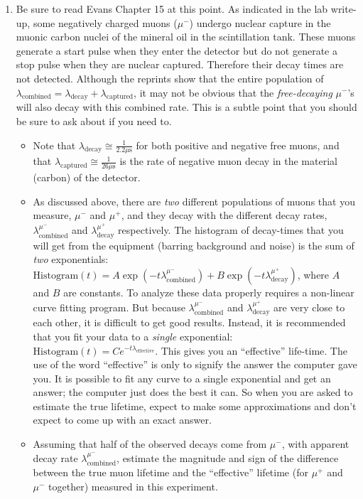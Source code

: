 \documentclass{../lab}
\begin{document}
\begin{enumerate}
    \item Be sure to read Evans Chapter 15 at this point. As indicated in the lab write-up, some negatively charged muons ($\mu^-$) undergo nuclear capture in the muonic carbon nuclei of the mineral oil in the scintillation tank. These muons generate a start pulse when they enter the detector but do not generate a stop pulse when they are nuclear captured. Therefore their decay times are not detected. Although the reprints show that the entire population of $\lambda_\text{combined} = \lambda_\text{decay} + \lambda_\text{captured}$, it may not be obvious that the \emph{free-decaying} $\mu^-$'s will also decay with this combined rate. This is a subtle point that you should be sure to ask about if you need to.

    \begin{itemize}
        \item Note that $ \lambda_\text{decay}\cong\frac{1}{2.2\mu\text{s}} $ for both positive and negative free muons, and that $ \lambda_\text{captured}\cong\frac{1}{26\mu\text{s}} $ is the rate of negative muon decay in the material (carbon) of the detector.

        \item As discussed above, there are \emph{two} different populations of muons that you measure, $\mu^-$ and $\mu^+$, and they decay with the different decay rates, $\lambda_\text{combined}^{\mu^-}$ and $\lambda_\text{decay}^{\mu^+}$ respectively. The histogram of decay-times that you will get from the equipment (barring background and noise) is the sum of \emph{two} exponentials: $\text{Histogram}(t) = A \exp(-t\lambda_\text{combined}^{\mu^-}) + B \exp(-t\lambda_\text{decay}^{\mu^+}) $, where $A$ and $B$ are constants. To analyze these data properly requires a non-linear curve fitting program. But because $\lambda_\text{combined}^{\mu^-}$ and $\lambda_\text{decay}^{\mu^+}$ are very close to each other, it is difficult to get good results. Instead, it is recommended that you fit your data to a \emph{single} exponential: $\text{Histogram}(t) = Ce^{-t\lambda_\text{effective}}$. This gives you an ``effective'' life-time. The use of the word ``effective'' is only to signify the answer the computer gave you. It is possible to fit any curve to a single exponential and get an answer; the computer just does the best it can. So when you are asked to estimate the true lifetime, expect to make some approximations and don't expect to come up with an exact answer.

        \item Assuming that half of the observed decays come from $\mu^-$, with apparent decay rate $\lambda_\text{combined}^{\mu^-}$, estimate the magnitude and sign of the difference between the true muon lifetime and the ``effective'' lifetime (for $\mu^+$ and $\mu^-$ together) measured in this experiment.


\end{itemize}
\end{enumerate}
\end{document}
